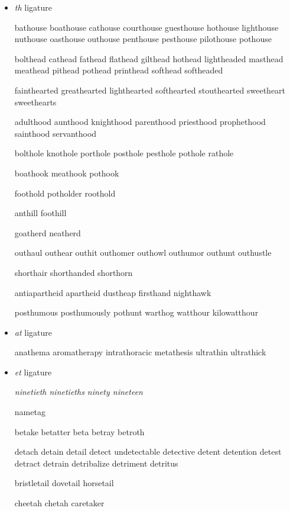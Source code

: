 \begin{itemize}

\item \emph{th} ligature

\bgroup \em

bathouse boathouse cathouse courthouse guesthouse hothouse lighthouse nuthouse
   oasthouse outhouse penthouse pesthouse pilothouse pothouse

bolthead cathead fathead flathead gilthead hothead lightheaded masthead
   meathead pithead pothead printhead softhead softheaded

fainthearted greathearted lighthearted softhearted stouthearted sweetheart
   sweethearts

adulthood aunthood knighthood parenthood priesthood prophethood sainthood
   servanthood

bolthole knothole porthole posthole pesthole pothole rathole

boathook meathook pothook

foothold potholder roothold

anthill foothill

goatherd neatherd

outhaul outhear outhit outhomer outhowl outhumor outhunt outhustle

shorthair shorthanded shorthorn %

antiapartheid apartheid dustheap firsthand nighthawk

posthumous posthumously pothunt warthog watthour kilowatthour




\egroup


\item \emph{at} ligature

\bgroup \em

anathema aromatherapy intrathoracic metathesis ultrathin ultrathick 
\egroup

\item \emph{et} ligature

\bgroup \em
ninetieth ninetieths ninety nineteen

nametag  

betake betatter beta betray betroth 

detach detain detail detect undetectable detective detent detention detest detract detrain detribalize detriment detritus

bristletail dovetail horsetail 

cheetah chetah caretaker 


\end{itemize}
